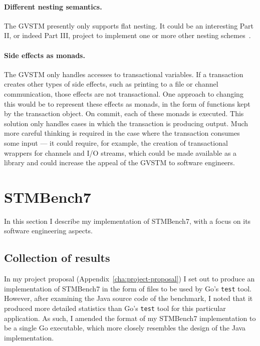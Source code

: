 \documentclass[12pt,a4paper,oneside,openright]{report}
\begin{document}
\paragraph{Different nesting semantics.} The GVSTM presently only
supports flat nesting. It could be an interesting Part II, or indeed
Part III, project to implement one or more other nesting
schemes~\cite{diegues2012review}.

\paragraph{Side effects as monads.} The GVSTM only handles accesses to
transactional variables. If a transaction creates other types of side
effects, such as printing to a file or channel communication, those
effects are not transactional. One approach to changing this would be
to represent these effects as monads, in the form of functions kept by
the transaction object. On commit, each of these monads is
executed. This solution only handles cases in which the transaction is
producing output. Much more careful thinking is required in the case
where the transaction consumes some input --- it could require, for
example, the creation of transactional wrappers for channels and I/O
streams, which could be made available as a library and could increase
the appeal of the GVSTM to software engineers.

\section{STMBench7}
\label{sec:impl:stmbench7}

In this section I describe my implementation of STMBench7, with a
focus on its software engineering aspects.

\subsection{Collection of results}
\label{sec:impl:collection-results}

In my project proposal (Appendix~\ref{cha:project-proposal}) I set out
to produce an implementation of STMBench7 in the form of files to be
used by Go's \texttt{test} tool. However, after examining the Java
source code of the benchmark, I noted that it produced more detailed
statistics than Go's \texttt{test} tool for this particular
application. As such, I amended the format of my STMBench7
implementation to be a single Go executable, which more closely
resembles the design of the Java implementation.
\end{document}
